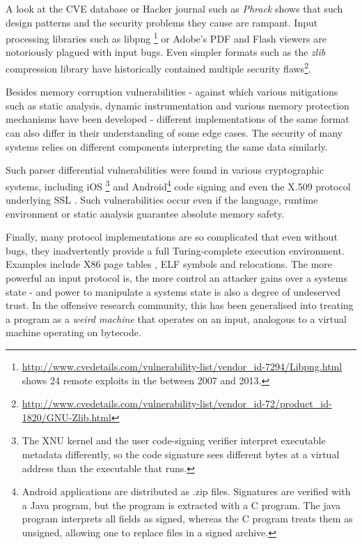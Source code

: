 \documentclass[10pt]{article}
\begin{document}
A look at the CVE database or Hacker journal such as \textit{Phrack} shows that such design patterns
and the security problems they cause are rampant. Input processing libraries such as libpng
\footnote{\url{http://www.cvedetails.com/vulnerability-list/vendor_id-7294/Libpng.html} shows 24
remote exploits in the between 2007 and 2013.} or Adobe's PDF and Flash viewers are notoriously
plagued with input bugs. Even simpler formats such as the \textit{zlib} compression library have
historically contained multiple security
flaws\footnote{\url{http://www.cvedetails.com/vulnerability-list/vendor_id-72/product_id-1820/GNU-Zlib.html}}.

Besides memory corruption vulnerabilities - against which various mitigations such as static
analysis, dynamic instrumentation and various memory protection mechanisms have been developed -
different implementations of the same format can also differ in their understanding of some edge
cases. The security of many systems relies on different components interpreting the same data
similarly.

Such parser differential vulnerabilities were found in various cryptographic systems, including  iOS
\footnote{The XNU kernel and the user code-signing verifier interpret executable metadata
  differently, so the code signature sees different bytes at a virtual address than the executable
  that runs.}\cite{evaders6} and Android\footnote{Android applications are distributed as .zip
  files. Signatures are verified with a Java program, but the program is extracted with a C program.
The java program interprets all fields as signed, whereas the C program treats them as unsigned,
allowing one to replace files in a signed archive.}
\cite{saurik-masterkey} code signing and even the
X.509 protocol underlying SSL \cite{DBLP:conf/fc/KaminskyPS10}. Such vulnerabilities occur even if the language,
runtime environment or static analysis guarantee absolute memory safety.

Finally, many protocol implementations are so complicated that even without bugs, they inadvertently
provide a full Turing-complete execution environment. Examples include X86 page tables
\cite{bangert2013page}, ELF symbols and relocations\cite{shapiro2013weird}.  
The more powerful an input
protocol is, the more control an attacker gains over a systems state - and power to manipulate a
systems state is also a degree of undeserved trust. In the offensive research community, this has
been generalised into treating a program as a \textit{weird machine}\cite{bratus2011exploit} that
operates on an input, analogous to a virtual machine operating on bytecode.
\end{document}
